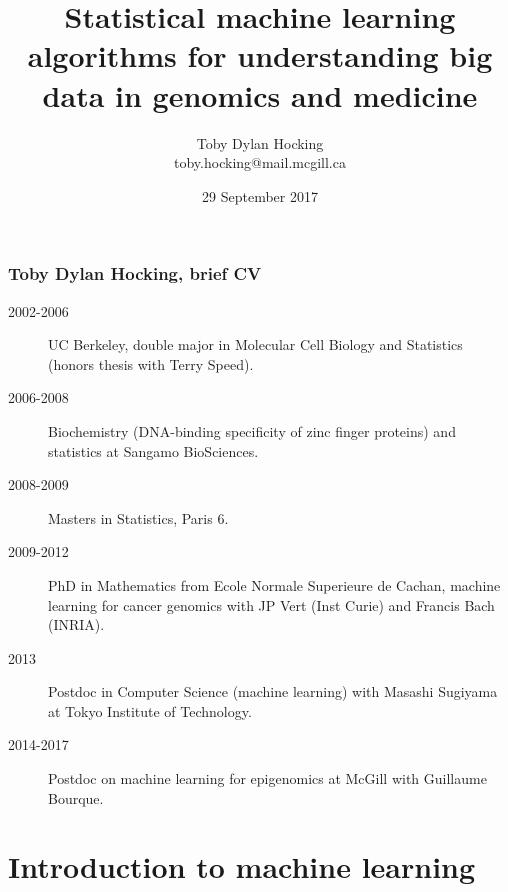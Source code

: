 \documentclass{beamer}
\begin{document}
\title{Statistical machine 
learning algorithms for 
understanding big data in
  genomics and medicine}
\date{29 September 2017}
\author{
  Toby Dylan Hocking\\
  toby.hocking@mail.mcgill.ca
}

\maketitle

\begin{frame}
  \frametitle{Toby Dylan Hocking, brief CV}
  \begin{description}
  \item[2002-2006] UC Berkeley, double major in Molecular Cell Biology
    and Statistics (honors thesis with Terry Speed).
  \item[2006-2008] Biochemistry (DNA-binding specificity of zinc
    finger proteins) and statistics at Sangamo BioSciences.
  \item[2008-2009] Masters in Statistics, Paris 6.
  \item[2009-2012] PhD in Mathematics from Ecole Normale Superieure de
    Cachan, machine learning for cancer genomics with JP Vert (Inst Curie)
    and Francis Bach (INRIA).
  \item[2013] Postdoc in Computer Science (machine learning) with Masashi Sugiyama at Tokyo
    Institute of Technology.
  \item[2014-2017] Postdoc on machine learning for epigenomics
    at McGill with Guillaume Bourque.
  \end{description}
\end{frame}

\section{Introduction to machine learning}
\end{document}
